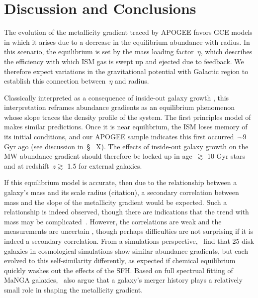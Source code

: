 
%



%

\section{Discussion and Conclusions}
\label{outflows:sec:disc-conc}

The evolution of the metallicity gradient traced by APOGEE favors GCE models in
which it arises due to a decrease in the equilibrium abundance with radius.
In this scenario, the equilibrium is set by the mass loading factor~$\eta$,
which describes the efficiency with which ISM gas is swept up and ejected due
to feedback.
We therefore expect variations in the gravitational potential with Galactic
region to establish this connection between~$\eta$ and radius.
\par
Classically interpreted as a consequence of inside-out galaxy growth
\citep[e.g.,][]{Kauffmann1996}, this interpretation reframes abundance
gradients as an equilibrium phenomenon whose slope traces the density profile
of the system.
The first principles model of~\citet{Sharda2021b} makes similar predictions.
Once it is near equilibrium, the ISM loses memory of its initial conditions,
and our APOGEE sample indicates this first occurred~$\sim$$9$ Gyr ago (see
discussion in~\S~{\color{red} X}).
The effects of inside-out galaxy growth on the MW abundance gradient should
therefore be locked up in age~$\gtrsim$ 10 Gyr stars and at
redshift~$z \gtrsim$ 1.5 for external galaxies.
\par
If this equilibrium model is accurate, then due to the relationship between
a galaxy's mass and its scale radius {\color{red} (citation)}, a secondary
correlation between mass and the slope of the metallicity gradient would be
expected.
Such a relationship is indeed observed, though there are indications that the
trend with mass may be complicated~\citep{Belfiore2017, Maiolino2019}.
However, the correlations are weak and the measurements are uncertain
\citep{Yuan2013, Acharyya2020, Poetrodjojo2021}, though perhaps difficulties
are not surprising if it is indeed a secondary correlation.
From a simulations perspective,~\citet{Pilkington2012} find that 25 disk
galaxies in cosmological simulations show similar abundance gradients, but
each evolved to this self-similarity differently, as expected if chemical
equilibrium quickly washes out the effects of the SFH.
Based on full spectrual fitting of MaNGA galaxies,~\citet{Goddard2017} also
argue that a galaxy's merger history plays a relatively small role in shaping
the metallicity gradient.


